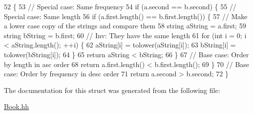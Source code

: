 \begin{DoxyCode}
52                                                                                 \{
53             \textcolor{comment}{// Special case: Same frequency}
54             \textcolor{keywordflow}{if} (a.second == b.second) \{
55                 \textcolor{comment}{// Special case: Same length}
56                 \textcolor{keywordflow}{if} (a.first.length() == b.first.length()) \{
57                     \textcolor{comment}{// Make a lower case copy of the strings and compare them}
58                     \textcolor{keywordtype}{string} aString = a.first;
59                     \textcolor{keywordtype}{string} bString = b.first;
60                     \textcolor{comment}{// Inv: They have the same length}
61                     \textcolor{keywordflow}{for} (\textcolor{keywordtype}{int} i = 0; i < aString.length(); ++i) \{
62                         aString[i] = tolower(aString[i]);
63                         bString[i] = tolower(bString[i]);
64                     \}
65                     \textcolor{keywordflow}{return} aString < bString;
66                 \}
67                 \textcolor{comment}{// Base case: Order by length in asc order}
68                 \textcolor{keywordflow}{return} a.first.length() < b.first.length();
69             \}
70             \textcolor{comment}{// Base case: Order by frequency in desc order}
71             \textcolor{keywordflow}{return} a.second > b.second;
72         \}
\end{DoxyCode}


The documentation for this struct was generated from the following file\+:\begin{DoxyCompactItemize}
\item 
\hyperlink{_book_8hh}{Book.\+hh}\end{DoxyCompactItemize}
